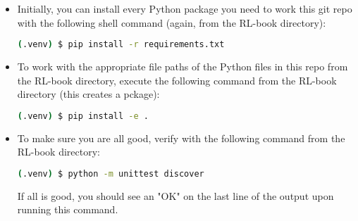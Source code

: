 \documentclass[12pt]{exam}
\begin{document}
\begin{questions}
\begin{itemize}
\item Initially, you can install every Python package you need to work this git repo with the following shell command (again, from the RL-book directory):
\begin{lstlisting}[language=bash]
(.venv) $ pip install -r requirements.txt
\end{lstlisting}
\item To work with the appropriate file paths of the Python files in this repo from the RL-book directory, execute the following command from the RL-book directory (this creates a pckage):
\begin{lstlisting}[language=bash]
(.venv) $ pip install -e .
\end{lstlisting}
\item To make sure you are all good, verify with the following command from the RL-book directory:
\begin{lstlisting}[language=bash]
(.venv) $ python -m unittest discover
\end{lstlisting}
If all is good, you should see an "OK" on the last line of the output upon running this command.
\end{itemize}
\end{questions}
\end{document}
